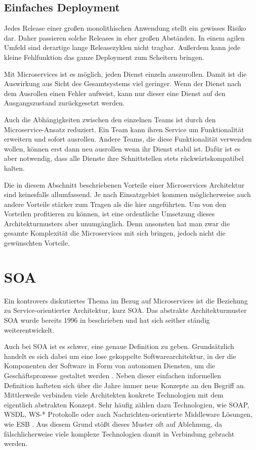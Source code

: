 \subsection{Einfaches Deployment}

Jedes Release einer großen monolithischen Anwendung stellt ein gewisses Risiko dar. Daher passieren solche Releases in eher großen Abständen. In einem agilen Umfeld sind derartige lange Releasezyklen nicht tragbar. Außerdem kann jede kleine Fehlfunktion das ganze Deployment zum Scheitern bringen.

Mit Microservices ist es möglich, jeden Dienst einzeln auszurollen. Damit ist die Auswirkung aus Sicht des Gesamtsystems viel geringer. Wenn der Dienst nach dem Ausrollen einen Fehler aufweist, kann nur dieser eine Dienst auf den Ausgangszustand zurückgesetzt werden.

Auch die Abhängigkeiten zwischen den einzelnen Teams ist durch den Microservice-Ansatz reduziert. Ein Team kann ihren Service um Funktionalität erweitern und sofort ausrollen. Andere Teams, die diese Funktionalität verwenden wollen, können erst dann neu ausrollen wenn ihr Dienst stabil ist. Dafür ist es aber notwendig, dass alle Dienste ihre Schnittstellen stets rückwärtskompatibel halten.

Die in diesem Abschnitt beschriebenen Vorteile einer Microservices Architektur sind keinesfalls allumfassend. Je nach Einsatzgebiet kommen möglicherweise auch andere Vorteile stärker zum Tragen als die hier angeführten. Um von den Vorteilen profitieren zu können, ist eine ordentliche Umsetzung dieses Architekturmusters aber unumgänglich. Denn ansonsten hat man zwar die gesamte Komplexität die Microservices mit sich bringen, jedoch nicht die gewünschten Vorteile.

\section{SOA}

Ein kontrovers diskutiertes Thema im Bezug auf Microservices ist die Beziehung zu Service-orientierter Architektur, kurz SOA. Das abstrakte Architekturmuster SOA wurde bereits 1996 in \cite{schulte1996service} beschrieben und hat sich seither ständig weiterentwickelt.

Auch bei SOA ist es schwer, eine genaue Definition zu geben. Grundsätzlich handelt es sich dabei um eine lose gekoppelte Softwarearchitektur, in der die Komponenten der Software in Form von autonomen Diensten, um die Geschäftsprozesse gestaltet werden \cite{soaRW}. Neben dieser einfachen informellen Definition hafteten sich über die Jahre immer neue Konzepte an den Begriff an. Mittlerweile verbinden viele Architekten konkrete Technologien mit dem eigentlich abstrakten Konzept. Sehr häufig zählen dazu Technologien, wie SOAP, WSDL, WS-* Protokolle oder auch Nachrichten-orientierte Middleware Lösungen, wie ESB \cite{fowlerGoTo}. Aus diesem Grund stößt dieses Muster oft auf Ablehnung, da fälschlicherweise viele komplexe Technologien damit in Verbindung gebracht werden.

